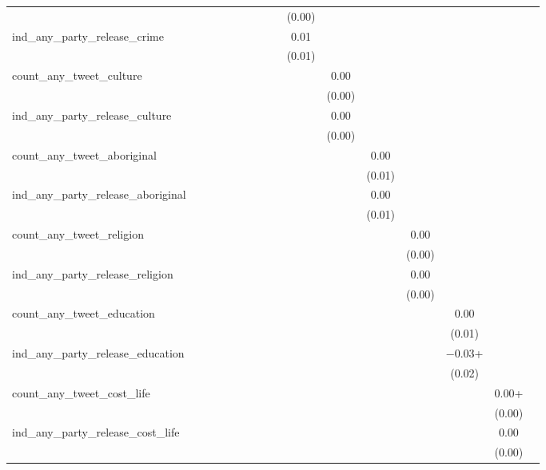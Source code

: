 \begin{table}
\begin{tabular}[t]{lccccccccccccccc}
 &  &  &  &  &  &  &  &  & (\num{0.00}) &  &  &  &  &  & \\
ind\_any\_party\_release\_crime &  &  &  &  &  &  &  &  & \num{0.01} &  &  &  &  &  & \\
 &  &  &  &  &  &  &  &  & (\num{0.01}) &  &  &  &  &  & \\
count\_any\_tweet\_culture &  &  &  &  &  &  &  &  &  & \num{0.00} &  &  &  &  & \\
 &  &  &  &  &  &  &  &  &  & (\num{0.00}) &  &  &  &  \vphantom{1} & \\
ind\_any\_party\_release\_culture &  &  &  &  &  &  &  &  &  & \num{0.00} &  &  &  &  & \\
 &  &  &  &  &  &  &  &  &  & (\num{0.00}) &  &  &  &  & \\
count\_any\_tweet\_aboriginal &  &  &  &  &  &  &  &  &  &  & \num{0.00} &  &  &  & \\
 &  &  &  &  &  &  &  &  &  &  & (\num{0.01}) &  &  &  \vphantom{1} & \\
ind\_any\_party\_release\_aboriginal &  &  &  &  &  &  &  &  &  &  & \num{0.00} &  &  &  & \\
 &  &  &  &  &  &  &  &  &  &  & (\num{0.01}) &  &  &  & \\
count\_any\_tweet\_religion &  &  &  &  &  &  &  &  &  &  &  & \num{0.00} &  &  & \\
 &  &  &  &  &  &  &  &  &  &  &  & (\num{0.00}) &  &  \vphantom{1} & \\
ind\_any\_party\_release\_religion &  &  &  &  &  &  &  &  &  &  &  & \num{0.00} &  &  & \\
 &  &  &  &  &  &  &  &  &  &  &  & (\num{0.00}) &  &  & \\
count\_any\_tweet\_education &  &  &  &  &  &  &  &  &  &  &  &  & \num{0.00} &  & \\
 &  &  &  &  &  &  &  &  &  &  &  &  & (\num{0.01}) &  & \\
ind\_any\_party\_release\_education &  &  &  &  &  &  &  &  &  &  &  &  & \num{-0.03}+ &  & \\
 &  &  &  &  &  &  &  &  &  &  &  &  & (\num{0.02}) &  & \\
count\_any\_tweet\_cost\_life &  &  &  &  &  &  &  &  &  &  &  &  &  & \num{0.00}+ & \\
 &  &  &  &  &  &  &  &  &  &  &  &  &  & (\num{0.00}) \vphantom{1} & \\
ind\_any\_party\_release\_cost\_life &  &  &  &  &  &  &  &  &  &  &  &  &  & \num{0.00} & \\
 &  &  &  &  &  &  &  &  &  &  &  &  &  & (\num{0.00}) & \\

\end{tabular}
\end{table}
